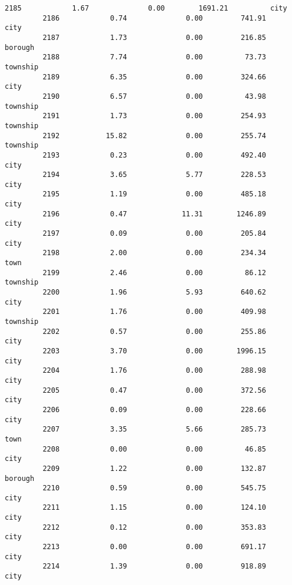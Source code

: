 \documentclass[11pt]{llncs}
\begin{document}
\begin{Verbatim}[commandchars=\\\{\}]
         2185            1.67              0.00        1691.21          city   
         2186            0.74              0.00         741.91          city   
         2187            1.73              0.00         216.85       borough   
         2188            7.74              0.00          73.73      township   
         2189            6.35              0.00         324.66          city   
         2190            6.57              0.00          43.98      township   
         2191            1.73              0.00         254.93      township   
         2192           15.82              0.00         255.74      township   
         2193            0.23              0.00         492.40          city   
         2194            3.65              5.77         228.53          city   
         2195            1.19              0.00         485.18          city   
         2196            0.47             11.31        1246.89          city   
         2197            0.09              0.00         205.84          city   
         2198            2.00              0.00         234.34          town   
         2199            2.46              0.00          86.12      township   
         2200            1.96              5.93         640.62          city   
         2201            1.76              0.00         409.98      township   
         2202            0.57              0.00         255.86          city   
         2203            3.70              0.00        1996.15          city   
         2204            1.76              0.00         288.98          city   
         2205            0.47              0.00         372.56          city   
         2206            0.09              0.00         228.66          city   
         2207            3.35              5.66         285.73          town   
         2208            0.00              0.00          46.85          city   
         2209            1.22              0.00         132.87       borough   
         2210            0.59              0.00         545.75          city   
         2211            1.15              0.00         124.10          city   
         2212            0.12              0.00         353.83          city   
         2213            0.00              0.00         691.17          city   
         2214            1.39              0.00         918.89          city   
         

\end{Verbatim}
\end{document}
